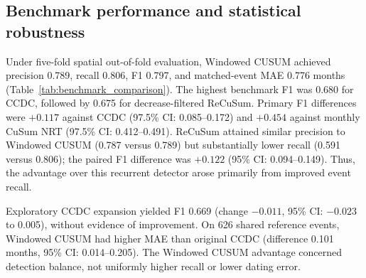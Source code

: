 \subsection{Benchmark performance and statistical robustness}
\label{sec:benchmark_null_sensitivity}

Under five-fold spatial out-of-fold evaluation, Windowed CUSUM achieved precision 0.789, recall 0.806, F1 0.797, and matched-event MAE 0.776 months (Table~\ref{tab:benchmark_comparison}). The highest benchmark F1 was 0.680 for CCDC, followed by 0.675 for decrease-filtered ReCuSum. Primary F1 differences were $+0.117$ against CCDC (97.5\% CI: 0.085--0.172) and $+0.454$ against monthly CuSum NRT (97.5\% CI: 0.412--0.491). ReCuSum attained similar precision to Windowed CUSUM (0.787 versus 0.789) but substantially lower recall (0.591 versus 0.806); the paired F1 difference was $+0.122$ (95\% CI: 0.094--0.149). Thus, the advantage over this recurrent detector arose primarily from improved event recall.

Exploratory CCDC expansion yielded F1 0.669 (change $-0.011$, 95\% CI: $-0.023$ to 0.005), without evidence of improvement. On 626 shared reference events, Windowed CUSUM had higher MAE than original CCDC (difference 0.101 months, 95\% CI: 0.014--0.205). The Windowed CUSUM advantage concerned detection balance, not uniformly higher recall or lower dating error.

